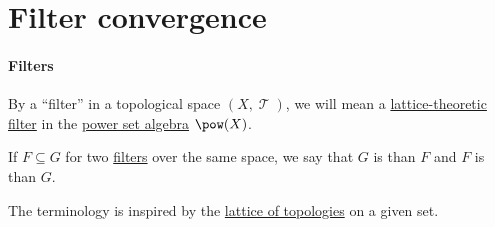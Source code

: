 \section{Filter convergence}\label{sec:filter_convergence}

\paragraph{Filters}

\begin{definition}\label{def:topological_filter}
  By a \enquote{filter} in a topological space \( (X, \mscrT) \), we will mean a \hyperref[def:lattice_ideal]{lattice-theoretic filter} in the \hyperref[def:power_set_algebra]{power set algebra} \( \pow(X) \).
\end{definition}

\begin{definition}\label{def:filter_ordering}
  If \( F \subseteq G \) for two \hyperref[def:topological_filter]{filters} over the same space, we say that \( G \) is  than \( F \) and \( F \) is  than \( G \).
\end{definition}
\begin{comments}
  \item The terminology is inspired by the \hyperref[def:topological_space_ordering]{lattice of topologies} on a given set.
\end{comments}
